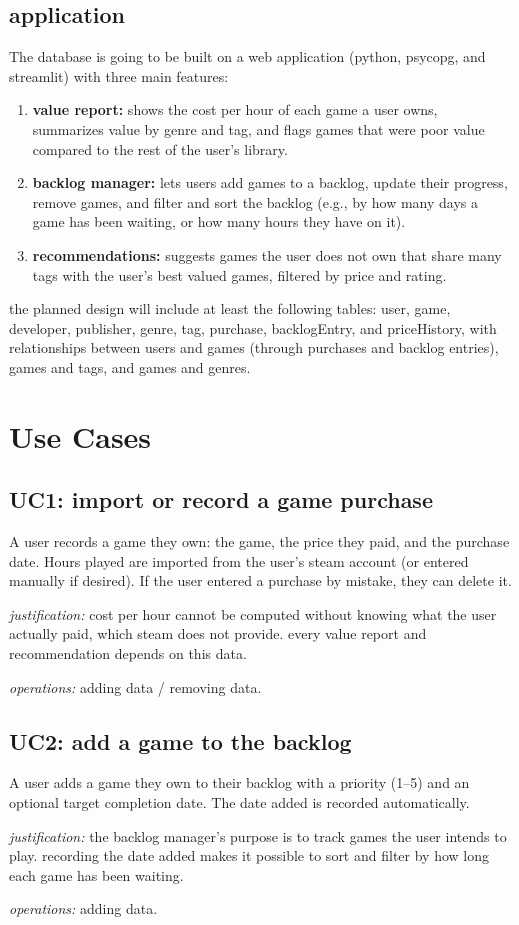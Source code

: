 \documentclass[11pt]{article}
\newcommand{\ops}[1]{\par\smallskip\textit{operations:} #1}
\newcommand{\why}[1]{\par\textit{justification:} #1}
\begin{document}
\subsection{application}
The database is going to be built on a web application (python, psycopg, and streamlit) with
three main features:
\begin{enumerate}
  \item \textbf{value report:} shows the cost per hour of each game a user owns,
        summarizes value by genre and tag, and flags games that were poor value
        compared to the rest of the user's library.
  \item \textbf{backlog manager:} lets users add games to a backlog, update their
        progress, remove games, and filter and sort the backlog (e.g., by how many
        days a game has been waiting, or how many hours they have on it).
  \item \textbf{recommendations:} suggests games the user does not own that share
        many tags with the user's best valued games, filtered by price and rating.
\end{enumerate}
the planned design will include at least the following tables:
\textsf{user}, \textsf{game}, \textsf{developer}, \textsf{publisher},
\textsf{genre}, \textsf{tag}, \textsf{purchase}, \textsf{backlogEntry}, and
\textsf{priceHistory}, with relationships between users and games
(through purchases and backlog entries), games and tags, and games and genres.

\newpage
\section{Use Cases}

\subsection{UC1: import or record a game purchase}
A user records a game they own: the game, the price they paid, and the purchase
date. Hours played are imported from the user's steam account (or entered manually if desired).
If the user entered a purchase by mistake, they can delete it.
\why{cost per hour cannot be computed without knowing what the user actually paid,
which steam does not provide. every value report and recommendation depends on this
data.}
\ops{adding data / removing data.}

\subsection{UC2: add a game to the backlog}
A user adds a game they own to their backlog with a priority (1--5) and an optional
target completion date. The date added is recorded automatically.
\why{the backlog manager's purpose is to track games the user intends to play.
recording the date added makes it possible to sort and filter by how long each game
has been waiting.}
\ops{adding data.}
\end{document}
